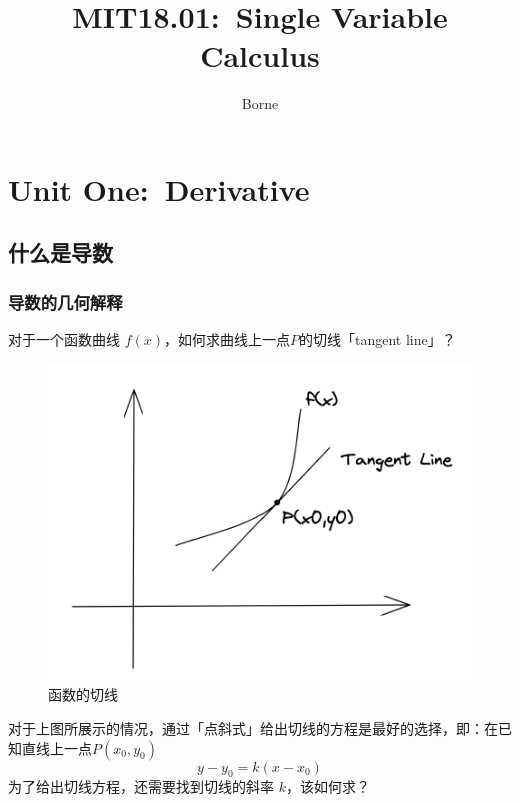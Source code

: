 \documentclass{ctexart}
\title{MIT18.01:\ Single Variable Calculus}
\author{Borne}
\date{\zhtoday}
\numberwithin{equation}{section}
\numberwithin{figure}{section}
\begin{document}
\maketitle
\thispagestyle{empty}

\newpage
\tableofcontents
\thispagestyle{empty}
\newpage
\setcounter{page}{1}

\newpage
\section{Unit One:\ Derivative}
\subsection{什么是导数}
\subsubsection{导数的几何解释}
对于一个函数曲线 \(f(x)\)，如何求曲线上一点\(P\)的切线「tangent line」？

\begin{figure}[H]
    \centering
    \includegraphics[scale=0.45]{images/tagentline.png}
    \caption{函数的切线}
\end{figure}

对于上图所展示的情况，通过「点斜式」给出切线的方程是最好的选择，即：在已知直线上一点\(P(x_0,y_0)\)
\begin{equation}
    y - y_0 = k(x - x_0)
\end{equation}
为了给出切线方程，还需要找到切线的斜率 \(k\)，该如何求？
\end{document}
